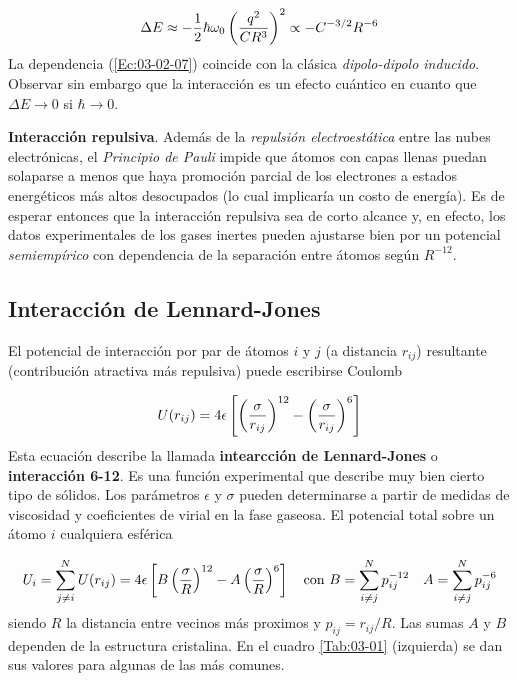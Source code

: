 \begin{equation}
\Delta E \approx - \frac{1}{2} \hbar \omega_0 \left( \frac{q^2}{CR^3} \right)^2 \propto -C^{-3/2}  R^{-6} \label{Ec:03-02-07}
\end{equation}
La dependencia (\ref{Ec:03-02-07}) coincide con la clásica \textit{dipolo-dipolo inducido}. Observar sin embargo que la interacción es un efecto cuántico en cuanto que $\Delta E \rightarrow 0$ si $\hbar \rightarrow 0$. 

\textbf{Interacción repulsiva}. Además de la \textit{repulsión electroestática} entre las nubes electrónicas, el \textit{Principio de Pauli} impide que átomos con capas llenas puedan solaparse a menos que haya promoción parcial de los electrones a estados energéticos más altos desocupados (lo cual implicaría un costo de energía). Es de esperar entonces que la interacción repulsiva sea de corto alcance y, en efecto, los datos experimentales de los gases inertes pueden ajustarse bien por un potencial \textit{semiempírico} con dependencia de la separación entre átomos según $R^{-12}$.

\subsection{Interacción de Lennard-Jones}


El potencial de interacción por par de átomos $i$ y $j$ (a distancia $r_{ij}$) resultante (contribución atractiva más repulsiva) puede escribirse Coulomb

\begin{equation}
    U (r_{ij}) = 4 \epsilon \left[ \left( \frac{\sigma}{r_{ij}} \right)^{12}-\left( \frac{\sigma}{r_{ij}} \right)^6 \right]
\end{equation}
Esta ecuación describe la llamada \textbf{intearcción de Lennard-Jones} o  \textbf{interacción 6-12}. Es una función experimental que describe muy bien cierto tipo de sólidos. Los parámetros $\epsilon$ y $\sigma$ pueden determinarse a partir de medidas de viscosidad y coeficientes de virial en la fase gaseosa. El potencial total sobre un átomo $i$ cualquiera esférica

\begin{equation}
    U_i = \sum_{j\neq i}^N U(r_{ij}) = 4 \epsilon \left[ B \left( \frac{\sigma}{R} \right)^{12}-A\left( \frac{\sigma}{R} \right)^6 \right] \quad \text{con} \ B = \sum_{i\neq j}^N p_{ij}^{-12} \quad A = \sum_{i\neq j}^N p_{ij}^{-6} 
\end{equation}
siendo $R$ la distancia entre vecinos más proximos y $p_{ij}=r_{ij}/R$. Las sumas $A$ y $B$ dependen de la estructura cristalina. En el cuadro \ref{Tab:03-01} (izquierda) se dan sus valores para algunas de las más comunes.

